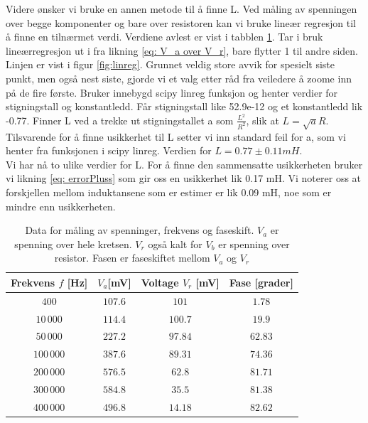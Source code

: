 \documentclass[norsk,a4paper,12pt]{article}
\begin{document}
Videre ønsker vi bruke en annen metode til å finne L. Ved måling av spenningen over begge komponenter og bare over resistoren kan vi bruke lineær regresjon til å finne en tilnærmet verdi. Verdiene avlest er vist i tabblen \ref{tab:dataLinReg}. Tar i bruk lineærregresjon ut i fra likning \ref{eq: V_a over V_r}, bare flytter 1 til andre siden. Linjen er vist i figur \ref{fig:linreg}. Grunnet veldig store avvik for spesielt siste punkt, men også nest siste, gjorde vi et valg etter råd fra veiledere å zoome inn på de fire første. Bruker innebygd scipy linreg funksjon og henter verdier for stigningstall og konstantledd. Får stigningstall like 52.9e-12 og et konstantledd lik -0.77. Finner L ved a trekke ut stigningstallet a som $\frac{L^2}{R^2}$, slik at $L = \sqrt{a}R$. Tilsvarende for å finne usikkerhet til L setter vi inn standard feil for a, som vi henter fra funksjonen i scipy linreg. Verdien for $L = 0.77 \pm 0.11 mH$. \\

Vi har nå to ulike verdier for L. For å finne den sammensatte usikkerheten bruker vi likning \ref{eq: errorPluss} som gir oss en usikkerhet lik 0.17 mH. Vi noterer oss at forskjellen mellom induktansene som er estimer er lik 0.09 mH, noe som er mindre enn usikkerheten.   \\

\begin{table}[htbp]
    \centering
    \caption{Data for måling av spenninger, frekvens og faseskift. $V_a$ er spenning over hele kretsen. $V_r$ også kalt for $V_b$ er spenning over resistor. Fasen er faseskiftet mellom $V_a$ og $V_r$ }
    \begin{tabular}{cccc}
    \hline
    \textbf{Frekvens $f$ [Hz]} & \textbf{$V_a$[mV]} & \textbf{Voltage $V_r$ [mV]} & \textbf{Fase [grader]} \\
    \hline
    $400$ & $107.6$ & $101$ & $1.78$ \\
    \hline
    $10\,000$ & $114.4$ & $100.7$ & $19.9$ \\
    \hline
    $50\, 000$ & $227.2$ & $97.84$ & $62.83$ \\
    \hline
    $100\, 000$ & $387.6$ & $89.31$ & $74.36$ \\
    \hline
    $200\, 000$ & $576.5$ & $62.8$ & $81.71$ \\
    \hline
    $300\, 000$ & $584.8$ & $35.5$ & $81.38$ \\
    \hline
    $400\, 000$ & $496.8$ & $14.18$ & $82.62$ \\
    \hline
    \end{tabular}
    
    \label{tab:dataLinReg}
\end{table}
\end{document}
